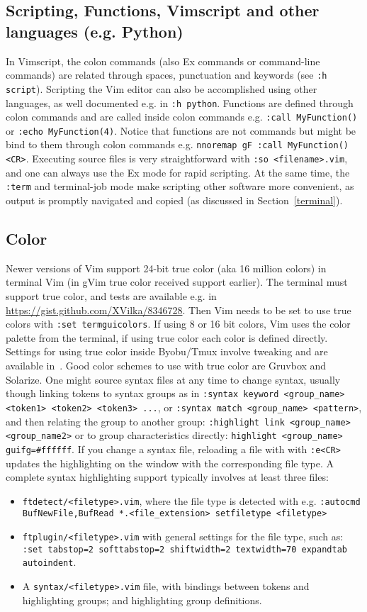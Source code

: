 \documentclass{article}
\newcommand{\tttt}[1]{\texttt{#1}}
\begin{document}
\subsection{Scripting, Functions, Vimscript and other languages (e.g.  Python)}\label{script}
In Vimscript,
the colon commands (also Ex commands or command-line commands) are related through spaces,
punctuation and keywords (see \texttt{:h script}).
Scripting the Vim editor can also be accomplished using other languages,
as well documented e.g. in \tttt{:h python}.
Functions are defined through colon commands and are called
inside colon commands e.g. \tttt{:call MyFunction()}
or \tttt{:echo MyFunction(4)}.
Notice that functions are not commands but might be bind to them
through colon commands e.g. \tttt{nnoremap gF :call MyFunction()<CR>}.
Executing source files is very straightforward with
\tttt{:so <filename>.vim},
and one can always use the Ex mode for rapid scripting.
At the same time, the \tttt{:term} and terminal-job mode make
scripting other software more convenient, as output is
promptly navigated and copied (as discussed in Section~\ref{terminal}).

\subsection{Color}\label{visual2}
Newer versions of Vim support 24-bit true color (aka 16 million colors)
in terminal Vim (in gVim true color received support earlier).
The terminal must support true color, and tests are available e.g. in
\url{https://gist.github.com/XVilka/8346728}.
Then Vim needs to be set to use true colors with
\tttt{:set termguicolors}.
If using 8 or 16 bit colors, Vim uses the color palette from the
terminal, if using true color each color is defined directly.
Settings for using true color inside Byobu/Tmux involve tweaking
and are available in~\cite{vimrc}.
Good color schemes to use with true color are Gruvbox
and Solarize.
One might source syntax files at any time to change syntax, usually
though linking tokens to syntax groups as in
\tttt{:syntax keyword <group\_name> <token1> <token2> <token3> ...},
or
\tttt{:syntax match <group\_name>	<pattern>},
and then relating the group to another group: 
\tttt{:highlight link <group\_name> <group\_name2>}
or to group characteristics directly:
\tttt{highlight <group\_name> guifg=\#ffffff}.
If you change a syntax file, reloading a file with with \tttt{:e<CR>}
updates the highlighting on the window with the corresponding file type.
A complete syntax highlighting support typically involves at least three files:
\begin{itemize}
  \item \tttt{ftdetect/<filetype>.vim}, where the file type is
    detected with e.g.
    \tttt{:autocmd BufNewFile,BufRead *.<file\_extension> setfiletype <filetype>}
  \item \tttt{ftplugin/<filetype>.vim} with general settings for the
    file type, such as: 
    \tttt{:set tabstop=2 softtabstop=2 shiftwidth=2 textwidth=70
    expandtab autoindent}.
  \item A \tttt{syntax/<filetype>.vim} file, with bindings between
    tokens and highlighting groups; and highlighting group definitions.
\end{itemize}
\end{document}
